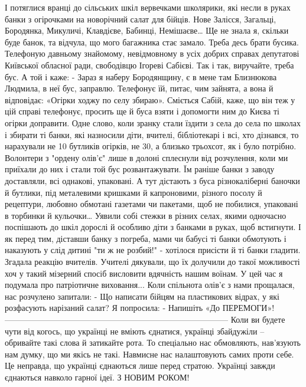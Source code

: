 І потяглися вранці до сільських шкіл вервечками школярики, які несли в руках банки з огірочками на новорічний салат для бійців. 
Нове Залісся, Загальці, Бородянка, Микуличі, Клавдієве, Бабинці, Немішаєве…
Ще не знала я, скільки буде банок, та відчула, що мого багажника стає замало. Треба десь брати бусика. Телефоную давньому знайомому, невідмовному в усіх добрих справах депутатові Київської обласної ради, свободівцю Ігореві Сабієві. Так і так, виручайте, треба бус. 
А той і каже:
- Зараз я наберу Бородянщину, є в мене там Близнюкова Людмила, в неї бус, заправлю.
Телефонує їй, питає, чим зайнята, а вона й відповідає: «Огірки ходжу по селу збираю». Сміється Сабій, каже, що він теж у цій справі телефонує, просить ще й буса взяти і допомогти ним до Києва ті огірки доправити.
Одне слово, коли зранку стали їздити з села до села по школах і збирати ті банки, які назносили діти, вчителі, бібліотекарі і всі, хто дізнався, то нарахували не 10 бутликів огірків, не 30, а близько трьохсот, як і було потрібно. 
Волонтери з "ордену олів'є" лише в долоні сплеснули від розчулення, коли ми приїхали до них і стали той бус розвантажувати.  Їм раніше банки з заводу доставляли, всі однакові, упаковані. А тут дістають з буса різнокаліберні баночки й бутлики, під металевими кришками й капроновими, різного посолу й рецептури, любовно обмотані газетами чи пакетами, щоб не побилися, упаковані в торбинки й кульочки… 
Уявили собі стежки в різних селах, якими одночасно поспішають до шкіл дорослі й особливо діти з банками в руках, щоб встигнути. І як перед тим, діставши банку з погреба, мами чи бабусі ті банки обмотують і наказують у слід дитині "ти ж не розбий!" - хотілося присісти й ті банки гладити. 
Згадала реакцію вчителів. Учителі дякували, що їх долучили до такої можливості хоч у такий мізерний спосіб висловити вдячність нашим воїнам. У цей час я подумала про патріотичне виховання... 
Коли спільнота олів’є з нами прощалася, нас  розчулено запитали: 
- Що написати бійцям на пластикових відрах, у які розфасують нарізаний салат?
Я попросила: 
- Напишіть «До ПЕРЕМОГИ»!
---------------------------------------------------------------------------------
Коли ви будете чути від когось, що українці не вміють єднатися, українці збайдужіли – обривайте такі слова й затикайте рота. То спеціально нас обмовляють, нав’язують нам думку, що ми якісь не такі. Навмисне нас налаштовують самих проти себе. Це неправда, що українці єднаються лише перед стратою. Українці завжди єднаються навколо гарної ідеї.
З НОВИМ РОКОМ!
